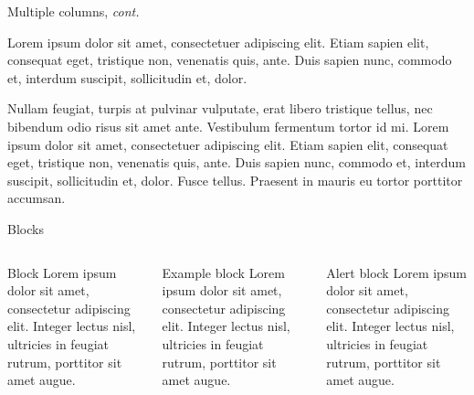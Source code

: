 \documentclass[aspectratio=1610]{beamer}
\begin{document}

\begin{frame}{Multiple columns, \textit{cont.}}
    \begin{multicols}{2}
        Lorem ipsum dolor sit amet, consectetuer adipiscing elit. Etiam sapien elit, consequat eget, tristique non, venenatis quis, ante. Duis sapien nunc, commodo et, interdum suscipit, sollicitudin et, dolor.
        \columnbreak
        
        Nullam feugiat, turpis at pulvinar vulputate, erat libero tristique tellus, nec bibendum odio risus sit amet ante. Vestibulum fermentum tortor id mi. Lorem ipsum dolor sit amet, consectetuer adipiscing elit. Etiam sapien elit, consequat eget, tristique non, venenatis quis, ante. Duis sapien nunc, commodo et, interdum suscipit, sollicitudin et, dolor. Fusce tellus. Praesent in mauris eu tortor porttitor accumsan.
    \end{multicols}
\end{frame}



\begin{frame}{Blocks}
    \begin{columns}
        \begin{block}{Block}
            Lorem ipsum dolor sit amet, consectetur adipiscing elit. Integer lectus nisl, ultricies in feugiat rutrum, porttitor sit amet augue.
        \end{block}

        \begin{exampleblock}{Example block}
            Lorem ipsum dolor sit amet, consectetur adipiscing elit. Integer lectus nisl, ultricies in feugiat rutrum, porttitor sit amet augue.
        \end{exampleblock}

        \begin{alertblock}{Alert block}
            Lorem ipsum dolor sit amet, consectetur adipiscing elit. Integer lectus nisl, ultricies in feugiat rutrum, porttitor sit amet augue.
        \end{alertblock}
    \end{columns}
\end{frame}
\end{document}
